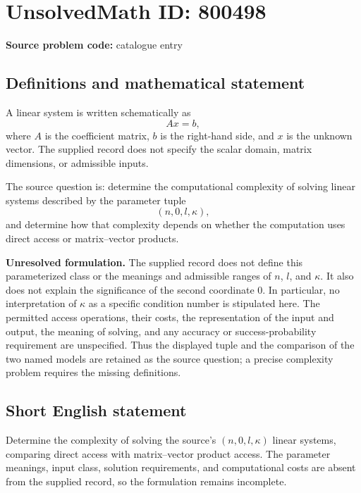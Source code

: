 \documentclass[11pt]{article}
\begin{document}
\section*{UnsolvedMath ID: 800498}
\textbf{Source problem code:} catalogue entry
\subsection{Definitions and mathematical statement}
A linear system is written schematically as
\[
Ax=b,
\]
where \(A\) is the coefficient matrix, \(b\) is the right-hand side, and \(x\) is the unknown vector. The supplied record does not specify the scalar domain, matrix dimensions, or admissible inputs.

The source question is: determine the computational complexity of solving linear systems described by the parameter tuple
\[
(n,0,l,\kappa),
\]
and determine how that complexity depends on whether the computation uses direct access or matrix--vector products.

\textbf{Unresolved formulation.} The supplied record does not define this parameterized class or the meanings and admissible ranges of \(n\), \(l\), and \(\kappa\). It also does not explain the significance of the second coordinate \(0\). In particular, no interpretation of \(\kappa\) as a specific condition number is stipulated here. The permitted access operations, their costs, the representation of the input and output, the meaning of solving, and any accuracy or success-probability requirement are unspecified. Thus the displayed tuple and the comparison of the two named models are retained as the source question; a precise complexity problem requires the missing definitions.
\subsection{Short English statement}
Determine the complexity of solving the source's \((n,0,l,\kappa)\) linear systems, comparing direct access with matrix--vector product access. The parameter meanings, input class, solution requirements, and computational costs are absent from the supplied record, so the formulation remains incomplete.
\end{document}
